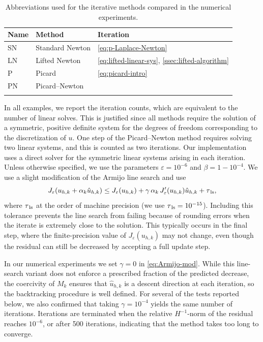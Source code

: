 \documentclass[11pt,pdflatex,sn-mathphys-num]{sn-jnl}
\theoremstyle{thmstyleone}%
\theoremstyle{thmstyletwo}%
\theoremstyle{thmstylethree}%
\begin{document}
\begin{table}[bh]
    \centering
    \caption{Abbreviations used for the iterative methods compared in the numerical experiments.}
    \label{tab:methods}
    \begin{tabular}{lll}
        \toprule
        Name & Method & Iteration \\
        \midrule
        SN & Standard Newton  & \eqref{eq:p-Laplace-Newton} \\
        LN & Lifted Newton    & \eqref{eq:lifted-linear-sys}, \cref{ssec:lifted-algorithm} \\
        P  & Picard           & \eqref{eq:picard-intro} \\
        PN & Picard--Newton   & \cite{PollockRebholzTuXiao25} \\
        \bottomrule
        \vspace{-6ex}
    \end{tabular}
\end{table}

In all examples, we report the iteration counts, which are equivalent to the number of linear solves. This is justified since all methods require the solution of a symmetric, positive definite system for the degrees of freedom corresponding to the discretization of $u$. One step of the Picard--Newton method requires solving two linear systems, and this is counted as two iterations. Our implementation uses a direct solver for the symmetric linear systems arising in each iteration.
Unless otherwise specified, we use the parameters $\varepsilon=10^{-6}$ and $\beta=1-10^{-4}$. We use a slight modification of the Armijo line search and use
\begin{equation}\label{eq:Armijo-mod}
    J_\varepsilon(u_{h,k}+\alpha_k\hat u_{h,k})\le J_\varepsilon(u_{h,k})+\gamma\,\alpha_k\,J_\varepsilon'(u_{h,k})\hat u_{h,k}+\tau_{\,\rm ls},
\end{equation}
where $\tau_{\,\rm ls}$ at the order of machine precision (we use $\tau_{\,\rm ls}=10^{-15}$). Including this tolerance prevents the line search from failing because of rounding errors when the iterate is extremely close to the solution. This typically occurs in the final step, where the finite-precision value of $J_\varepsilon(u_{h,k})$ may not change, even though the residual can still be decreased by accepting a full update step.

In our numerical experiments we set $\gamma=0$ in \eqref{eq:Armijo-mod}. While this line-search variant does not enforce a prescribed fraction of the predicted decrease, the coercivity of $M_k$ ensures that $\hat u_{h,k}$ is a descent direction at each iteration, so the backtracking procedure is well defined. For several of the tests reported below, we also confirmed that taking $\gamma=10^{-4}$ yields the same number of iterations.
Iterations are terminated when the relative $H^{-1}$-norm of the residual reaches $10^{-6}$, or after 500 iterations, indicating that the method takes too long to converge.
\end{document}
